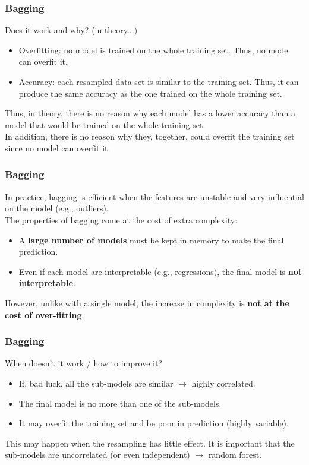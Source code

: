 \begin{frame}
\frametitle{Bagging}
Does it work and why? (in theory...)
\begin{itemize}
\item Overfitting: no model is trained on the whole training set. Thus, no model can overfit it.
\item Accuracy: each resampled data set is similar to the training set. Thus, it can produce the same accuracy as the one trained on the whole training set.
\end{itemize}
Thus, in theory, there is no reason why each model has a lower accuracy than a model that would be trained on the whole training set.\\
\vspace{0.3cm}
In addition, there is no reason why they, together, could overfit the training set since no model can overfit it.
\end{frame}
\begin{frame}
\frametitle{Bagging}
In practice, bagging is efficient when the features are unstable and very influential on the model (e.g., outliers).\\
\vspace{0.3cm}
The properties of bagging come at the cost of extra complexity: 
\begin{itemize}
\item A {\bf large number of models} must be kept in memory to make the final prediction.
\item Even if each model are interpretable (e.g., regressions), the final model is {\bf not interpretable}.
\end{itemize}
However, unlike with a single model, the increase in complexity is {\bf not at the cost of over-fitting}. 
\end{frame}
\begin{frame}
\frametitle{Bagging}
When doesn't it work / how to improve it?
\begin{itemize}
\item If, bad luck, all the sub-models are similar $\rightarrow$ highly correlated.
\item The final model is no more than one of the sub-models.
\item It may overfit the training set and be poor in prediction (highly variable).
\end{itemize}
This may happen when the resampling has little effect. It is important that the sub-models are uncorrelated (or even independent) $\rightarrow$ random forest.
\end{frame}
